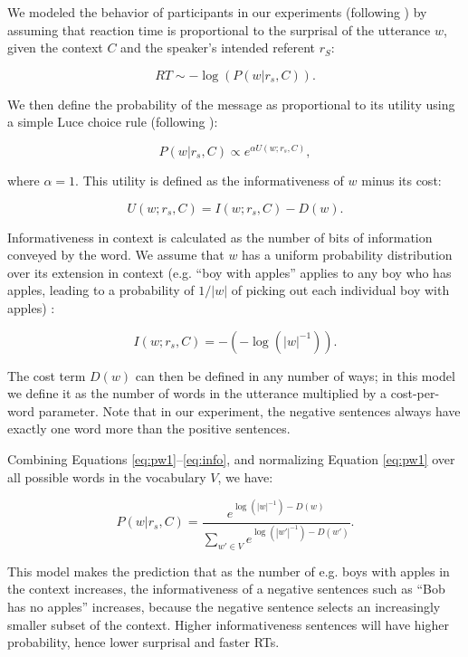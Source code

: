 \documentclass[10pt,letterpaper]{article}
\begin{document}
We modeled the behavior of participants in our experiments (following ) by assuming that reaction time is proportional to the surprisal of the utterance $w$, given the context $C$ and the speaker's intended referent $r_S$:

\begin{equation}
RT \sim -\log(P(w| r_s, C)).
\end{equation}

\noindent We then define the probability of the message as proportional to its utility using a simple Luce choice rule (following ):

\begin{equation}\label{eq:pw1}
P(w | r_s, C) \propto  e^{\alpha U(w;r_s,C)},
\end{equation} 

\noindent where $\alpha=1$. This utility is defined as the informativeness of $w$ minus its cost:

\begin{equation}\label{eq:utility}
U(w;r_s,C) = I(w;r_s, C) - D(w).
\end{equation}

\noindent Informativeness in context is calculated as the number of bits of information conveyed by the word. We assume that $w$ has a uniform probability distribution over its extension in context (e.g. ``boy with apples'' applies to any boy who has apples, leading to a probability of $1/|w|$ of picking out each individual boy with apples) :

\begin{equation}\label{eq:info}
I(w;r_s, C) = -(-\log(|w|^{-1})).
\end{equation}

\noindent The cost term $D(w)$ can then be defined in any number of ways; in this model we define it as the number of words in the utterance multiplied by a cost-per-word parameter.  Note that in our experiment, the negative sentences always have exactly one word more than the positive sentences. 

Combining Equations \ref{eq:pw1}--\ref{eq:info}, and normalizing Equation \ref{eq:pw1} over all possible words in the vocabulary $V$, we have:

\begin{equation}\label{eq:pw2}
P(w | r_s, C) = \frac{ e^{\log(|w|^{-1}) - D(w)}} {\sum_{w' \in V}{e^{\log(|w'|^{-1}) - D(w')}}}.
\end{equation}

\noindent This model makes the prediction that as the number of e.g. boys with apples in the context increases, the informativeness of a negative sentences such as ``Bob has no apples'' increases, because the negative sentence selects an increasingly smaller subset of the context. Higher informativeness sentences will have higher probability, hence lower surprisal and faster RTs. 
\end{document}
